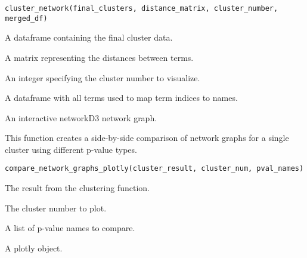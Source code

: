 \documentclass[a4paper]{book}
\begin{document}
%
\begin{Usage}
\begin{verbatim}
cluster_network(final_clusters, distance_matrix, cluster_number, merged_df)
\end{verbatim}
\end{Usage}
%
\begin{Arguments}
\begin{ldescription}
\item[\code{final\_clusters}] A dataframe containing the final cluster data.

\item[\code{distance\_matrix}] A matrix representing the distances between terms.

\item[\code{cluster\_number}] An integer specifying the cluster number to visualize.

\item[\code{merged\_df}] A dataframe with all terms used to map term indices to names.
\end{ldescription}
\end{Arguments}
%
\begin{Value}
An interactive networkD3 network graph.
\end{Value}
%
\begin{Description}
This function creates a side-by-side comparison of network graphs for a single
cluster using different p-value types.
\end{Description}
%
\begin{Usage}
\begin{verbatim}
compare_network_graphs_plotly(cluster_result, cluster_num, pval_names)
\end{verbatim}
\end{Usage}
%
\begin{Arguments}
\begin{ldescription}
\item[\code{cluster\_result}] The result from the clustering function.

\item[\code{cluster\_num}] The cluster number to plot.

\item[\code{pval\_names}] A list of p-value names to compare.
\end{ldescription}
\end{Arguments}
%
\begin{Value}
A plotly object.
\end{Value}
\end{document}

